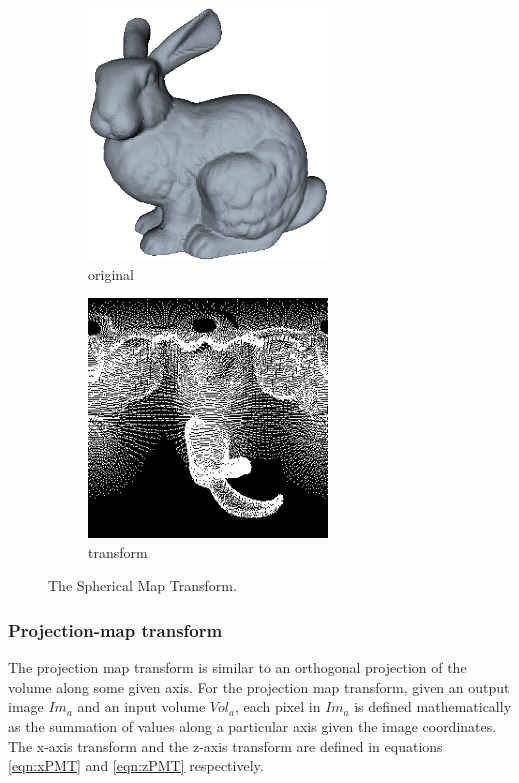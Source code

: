 \begin{figure}[!htb] 
        \centering
        \begin{subfigure}[b]{2.5in}
                \includegraphics[width=2.5in]{images/ch2/bunny}
                \caption{original}
                \label{fig:bunnyOrigAA}
        \end{subfigure}
        \begin{subfigure}[b]{2.5in}
                \includegraphics[width=2.5in]{images/ch2/spherical2DMap}
                \caption{transform}
                \label{fig:bunnySPTed}
        \end{subfigure}%
        \caption{The Spherical Map Transform.}
       \label{fig:smtExample}
\end{figure}


\subsubsection{Projection-map transform}
\label{sec:PMTramsform}
The projection map transform is similar to an orthogonal projection of the volume along some given axis. For the projection map transform, given an output image $Im_a$ and an input volume $Vol_a$, each pixel in $Im_a$ is defined mathematically as the summation of values along a particular axis given the image coordinates. The x-axis transform and the z-axis transform are defined in equations \ref{eqn:xPMT} and \ref{eqn:zPMT} respectively. \\

